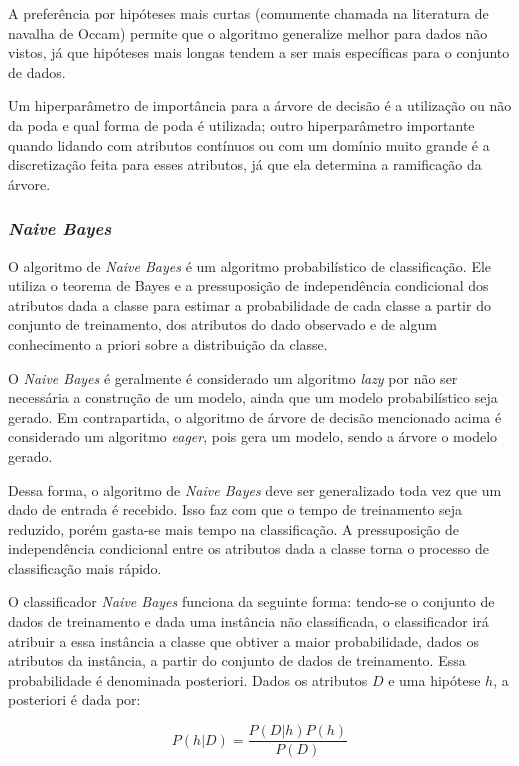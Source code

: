 \documentclass{article}
\begin{document}
A preferência por hipóteses mais curtas (comumente chamada na literatura de navalha de Occam) permite que o algoritmo generalize melhor para dados não vistos,
já que hipóteses mais longas tendem a ser mais específicas para o conjunto de dados.

Um hiperparâmetro de importância para a árvore de decisão é a utilização ou não da poda e qual forma de poda é utilizada;
outro hiperparâmetro importante quando lidando com atributos contínuos ou com um domínio muito grande é a discretização feita para esses atributos,
já que ela determina a ramificação da árvore.

\subsubsection{{\b \it Naive Bayes}}

O algoritmo de {\it Naive Bayes} é um algoritmo probabilístico de classificação. Ele utiliza o teorema de Bayes e a pressuposição de independência condicional dos atributos dada a classe para estimar a probabilidade de cada classe a partir do conjunto de treinamento, dos atributos do dado observado e de algum conhecimento a priori sobre a distribuição da classe.

O {\it Naive Bayes} é geralmente é considerado um algoritmo {\it lazy} por não ser necessária a construção de um modelo, ainda que um modelo probabilístico seja gerado. Em contrapartida, o algoritmo de árvore de decisão mencionado acima é considerado um algoritmo {\it eager}, pois gera um modelo, sendo a árvore o modelo gerado.

Dessa forma, o algoritmo de {\it Naive Bayes} deve ser generalizado toda vez que um dado de entrada é recebido. Isso faz com que o tempo de treinamento seja reduzido, porém gasta-se mais tempo na classificação. A pressuposição de independência condicional entre os atributos dada a classe torna o processo de classificação mais rápido.

O classificador {\it Naive Bayes} funciona da seguinte forma: tendo-se o conjunto de dados de treinamento e dada uma instância não classificada, o classificador irá atribuir a essa instância a classe que obtiver a maior probabilidade, dados os atributos da instância, a partir do conjunto de dados de treinamento. Essa probabilidade é denominada posteriori. Dados os atributos $D$ e uma hipótese $h$, a posteriori é dada por:

\begin{equation}
P(h|D) = \frac{P(D|h) P(h)}{P(D)}
\end{equation}
\end{document}
